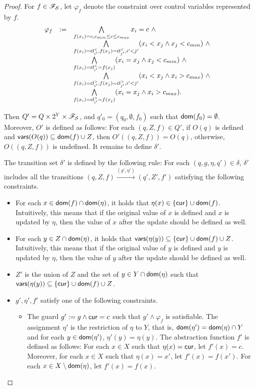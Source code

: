 \begin{appendix}
\begin{proof}
For $f \in \mathscr{F}_{\mathcal{S} }$, let $\varphi_f$ denote the constraint over control variables represented by $f$.
\[
\begin{array}{l c l }
\varphi_f  &:=& \bigwedge \limits_{f(x_i)=c,  c_{min} \le c \le c_{max}} x_i = c \ \wedge \\
&  & \bigwedge \limits_{f(x_i)=\mathsf{cl}^{<}_{i'}, f(x_j)=\mathsf{cl}^{<}_{j'}, i' < j' } (x_i < x_j \wedge x_j < c_{min})\  \wedge \\
& & \bigwedge \limits_{f(x_i)=\mathsf{cl}^{<}_{i'}= f(x_j)}(x_i = x_j \wedge x_j < c_{min})\ \wedge \\
& & \bigwedge \limits_{f(x_i)=\mathsf{cl}^{>}_{i'}, f(x_j)=\mathsf{cl}^{>}_{j'}, i' < j' } (x_i < x_j \wedge x_i > c_{max})\ \wedge \\
& & \bigwedge \limits_{f(x_i)=\mathsf{cl}^{>}_{i'}= f(x_j)} (x_i = x_j  \wedge x_i > c_{max}).
\end{array}
\]

Then $Q'= Q \times 2^Y \times \mathscr{F}_{\mathcal{S} }$, and $q'_0=(q_0, \emptyset, f_0)$ such that $\mathsf{dom}(f_0)=\emptyset$. Moreover, $O'$ is defined as follows: For each $(q, Z, f) \in Q'$, if $O(q)$  is defined and $\mathsf{vars}(O(q)) \subseteq \mathsf{dom}(f) \cup Z$, then $O'((q, Z, f))=O(q)$, otherwise, $O((q, Z, f))$ is undefined. It remains to define $\delta'$.

The transition set $\delta'$ is defined by the following rule: 
For each $(q, g, \eta, q') \in \delta$, $\delta'$ includes all the transitions $(q, Z, f) \xrightarrow{(g',\eta')} (q', Z', f')$ satisfying the following constraints. 
\begin{itemize}
\item For each $x \in \mathsf{dom}(f) \cap \mathsf{dom}(\eta)$, it holds that $\eta(x) \in \{\mathsf{cur}\} \cup \mathsf{dom}(f)$.  Intuitively, this means that if the original value of $x$ is defined  and $x$ is updated by $\eta$, then the value of $x$ after the update should be defined as well.

\item  For each $y \in Z \cap \mathsf{dom}(\eta)$, it holds that $\mathsf{vars}(\eta(y)) \subseteq \{\mathsf{cur}\} \cup  \mathsf{dom}(f) \cup Z$.  Intuitively, this means that if the original value of $y$ is defined and $y$ is updated by $\eta$, then the value of $y$ after the update should be defined as well.

\item $Z'$ is the union of $Z$ and the set of $y \in Y \cap \mathsf{dom}(\eta)$ such that $\mathsf{vars}(\eta(y)) \subseteq \{\mathsf{cur}\} \cup  \mathsf{dom}(f) \cup Z$.

\item $g',\eta', f'$ satisfy one of the following constraints.
\begin{itemize}
\item The guard $g' := g \wedge \mathsf{cur} = c$ such that $g' \wedge \varphi_f$ is satisfiable. The assignment $\eta'$ is the restriction of  $\eta$ to $Y$, that is, $\mathsf{dom}(\eta') = \mathsf{dom}(\eta) \cap Y$ and for each $y \in \mathsf{dom}(\eta')$, $\eta'(y)=\eta(y)$. The abstraction function $f'$ is defined as follows: For each $x \in X$ such that $\eta(x)=\mathsf{cur}$,  let $f'(x) = c$. Moreover, for each $x \in X$ such that $\eta(x) = x'$, let $f'(x)=f(x')$. For each $x \in X \setminus \mathsf{dom}(\eta)$, let $f'(x)=f(x)$.
 

\end{itemize}
\end{itemize}
\end{proof}
\end{appendix}
